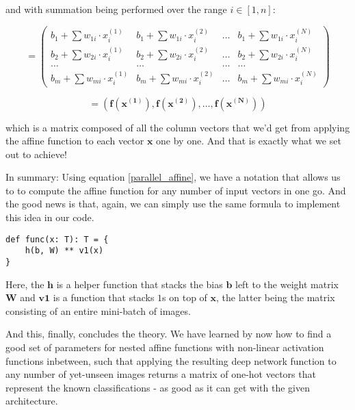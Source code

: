 \documentclass[]{report}
\begin{document}
and with summation being performed over the range \(i \in [1, n]\):

\begin{equation}
= \left(
\begin{array}{cccc} 
b_1 + \sum w_{1i} \cdot x_i^{(1)} & b_1 + \sum w_{1i} \cdot x_i^{(2)} & \dots & b_1 + \sum w_{1i} \cdot x_i^{(N)}
\\
b_2 + \sum w_{2i} \cdot x_i^{(1)} & b_2 + \sum w_{2i} \cdot x_i^{(2)} & \dots & b_2 + \sum w_{2i} \cdot x_i^{(N)}
\\
\dots & \dots & \dots & \dots
\\
b_m + \sum w_{mi} \cdot x_i^{(1)} & b_m + \sum w_{mi} \cdot x_i^{(2)} & \dots & b_m + \sum w_{mi} \cdot x_i^{(N)}
 \end{array}
\right)
\end{equation}

\begin{equation}
= \left(
\mathbf{f}(\mathbf{x^{(1)}}), \mathbf{f}(\mathbf{x^{(2)}}), \dots, \mathbf{f}(\mathbf{x^{(N)}})
\right)
\end{equation}

which is a matrix composed of all the column vectors that we'd get from applying the affine function to each vector \(\mathbf{x}\) one by one. And that is exactly what we set out to achieve!

In summary: Using equation \ref{parallel_affine}, we have a notation that allows us to to compute the affine function for any number of input vectors in one go. And the good news is that, again, we can simply use the same formula to implement this idea in our code.

\begin{lstlisting}[label=fn_optimized, caption=Optimizing affine functions]
def func(x: T): T = {
	h(b, W) ** v1(x)
}
\end{lstlisting}

Here, the \(\mathbf{h}\) is a helper function that stacks the bias \(\mathbf{b} \) left to the weight matrix \(\mathbf{W} \) and  \(\mathbf{v1} \) is a function that stacks \(1\)s on top of \(\mathbf{x} \), the latter being the matrix consisting of an entire mini-batch of images.

\bigskip

And this, finally, concludes the theory. We have learned by now how to find a good set of parameters for nested affine functions with non-linear activation functions inbetween, such that applying the resulting deep network function to any number of yet-unseen images returns a matrix of one-hot vectors that represent the known classifications - as good as it can get with the given architecture.  
\end{document}
